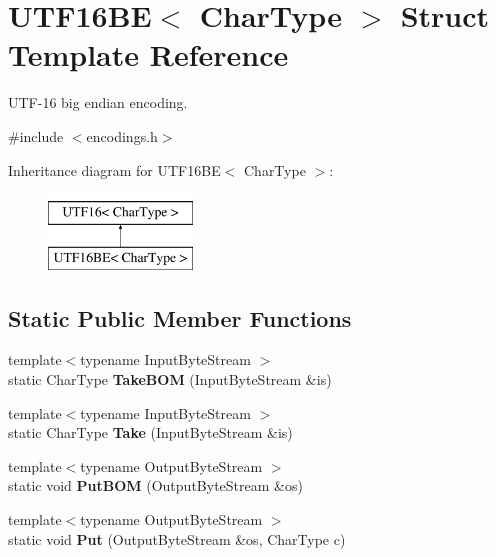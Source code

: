 \hypertarget{structUTF16BE}{}\section{U\+T\+F16\+BE$<$ Char\+Type $>$ Struct Template Reference}
\label{structUTF16BE}


U\+T\+F-\/16 big endian encoding.  




{\ttfamily \#include $<$encodings.\+h$>$}

Inheritance diagram for U\+T\+F16\+BE$<$ Char\+Type $>$\+:\begin{figure}[H]
\begin{center}
\leavevmode
\includegraphics[height=2.000000cm]{structUTF16BE}
\end{center}
\end{figure}
\subsection*{Static Public Member Functions}
\begin{DoxyCompactItemize}
\item 
{\footnotesize template$<$typename Input\+Byte\+Stream $>$ }\\static Char\+Type {\bfseries Take\+B\+OM} (Input\+Byte\+Stream \&is)\hypertarget{structUTF16BE_a5d5184a373149c69b4b8baf8507f9591}{}\label{structUTF16BE_a5d5184a373149c69b4b8baf8507f9591}

\item 
{\footnotesize template$<$typename Input\+Byte\+Stream $>$ }\\static Char\+Type {\bfseries Take} (Input\+Byte\+Stream \&is)\hypertarget{structUTF16BE_a671ca76d54f45aa5f62eb86c4e69738a}{}\label{structUTF16BE_a671ca76d54f45aa5f62eb86c4e69738a}

\item 
{\footnotesize template$<$typename Output\+Byte\+Stream $>$ }\\static void {\bfseries Put\+B\+OM} (Output\+Byte\+Stream \&os)\hypertarget{structUTF16BE_ae109dda1ad7955049589885ea5a13652}{}\label{structUTF16BE_ae109dda1ad7955049589885ea5a13652}

\item 
{\footnotesize template$<$typename Output\+Byte\+Stream $>$ }\\static void {\bfseries Put} (Output\+Byte\+Stream \&os, Char\+Type c)\hypertarget{structUTF16BE_ab0f964c3ec9ac6cc47f2875ae112dbfe}{}\label{structUTF16BE_ab0f964c3ec9ac6cc47f2875ae112dbfe}

\end{DoxyCompactItemize}
